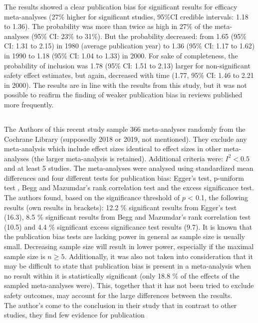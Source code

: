 \documentclass[11pt,a4paper,twoside]{book}\usepackage[]{graphicx}\usepackage[]{color}
\begin{document}
The results showed a clear publication bias for significant results for efficacy meta-analyses (27\% higher for significant studies, 95\%CI credible intervals: 1.18 to 1.36). The probability was more than twice as high in 27\% of the meta-analyses (95\% CI: 23\% to 31\%). But the probability decreased: from 1.65 (95\% CI: 1.31 to 2.15) in 1980 (average publication year) to 1.36 (95\% CI: 1.17 to 1.62) in 1990 to 1.18 (95\% CI: 1.04 to 1.33) in 2000. For sake of completeness, the probability of inclusion was  1.78 (95\% CI: 1.51 to 2.13) larger for non-significant safety effect estimates, but again, decreased with time (1.77, 95\% CI: 1.46 to 2.21 in 2000). The results are in line with the results from this study, but it was not possible to reafirm the finding of weaker publication bias in reviews published more frequently.\\

\subsection{\citet{vanAert.2019}}
The Authors of this recent study sample 366 meta-analyses randomly from the Cochrane Library (supposedly 2018 or 2019, not mentioned). They exclude any meta-analysis which include effect sizes identical to effect sizes in other meta-analyses (the larger meta-analysis is retained). Additional criteria were: $I^2 < 0.5$ and at least 5 studies. The meta-analyses were analysed using standardized mean differences and four different tests for publication bias: Egger's test, p-uniform test \citep{p.uniform}, Begg and Mazumdar's rank correlation test and the excess significance test. \\
The authors found, based on the significance threshold of $p$ < 0.1, the following results (own results in brackets):
12.2 \% significant results from Egger's test (16.3),
8.5 \% significant results from Begg and Mazumdar's rank correlation test (10.5) and
4.4 \% significant excess significance test results (9.7).
It is known that the publication bias tests are lacking power in general as sample size is usually small. Decreasing sample size will result in lower power, especially if the maximal sample size is $n \geq 5$. Additionally, it was also not taken into consideration that it may be difficult to state that publication bias is present in a meta-analysis when no result within it is statistically significant (only 18.8 \% of the effects of the sampled meta-analyses were). This, together that it has not been tried to exclude safety outcomes, may account for the large differences between the results. \\
The author's come to the conclusion in their study that in contrast to other studies, they find few evidence for publication
\end{document}
